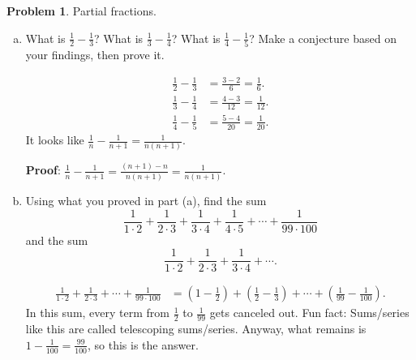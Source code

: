 \documentclass[11pt,oneside]{amsart}
\theoremstyle{definition}
\newtheorem{problem}{Problem}
\theoremstyle{plain}
\begin{document}
\begin{problem}
Partial fractions.
\leavevmode\begin{enumerate}[(a)]
  \item What is $\frac 12-\frac 13$? What is $\frac 13-\frac 14$? What is $\frac 14-\frac 15$? Make a conjecture based on your findings, then prove it.
        \begin{solution}
          \begin{align*}
            \frac12-\frac13 & = \frac{3-2}6=\frac 16.        \\
            \frac13-\frac14 & = \frac{4-3}{12} =\frac 1{12}. \\
            \frac14-\frac15 & = \frac{5-4}{20}=\frac 1{20}.
          \end{align*}
          It looks like $\frac 1n-\frac 1{n+1}=\frac 1{n(n+1)}$.

          \textbf{Proof}: $\frac 1n-\frac 1{n+1}=\frac{(n+1)-n}{n(n+1)}=\frac 1{n(n+1)}$.
        \end{solution}
  \item Using what you proved in part (a), find the sum
        \[\frac 1{1\cdot 2}+\frac 1{2\cdot3 }+\frac 1{3\cdot 4}+\frac 1{4\cdot 5}+\cdots+\frac 1{99\cdot 100}\]
        and the sum
        \[\frac 1{1\cdot 2}+\frac 1{2\cdot3 }+\frac 1{3\cdot 4}+\cdots.\]
        \begin{solution}
          \[\begin{split}
              \frac 1{1\cdot 2}+\frac 1{2\cdot 3}+\cdots+\frac 1{99\cdot 100} &= \left( 1-\frac 12 \right)+\left( \frac 12-\frac13 \right)+\cdots+\left( \frac1{99}-\frac1{100} \right).
            \end{split}\]
          In this sum, every term from $\frac12$ to $\frac 1{99}$ gets canceled out. Fun fact: Sums/series like this are called telescoping sums/series. Anyway, what remains is $1-\frac 1{100}=\frac{99}{100}$, so this is the answer.


\end{solution}
\end{enumerate}
\end{problem}
\end{document}
